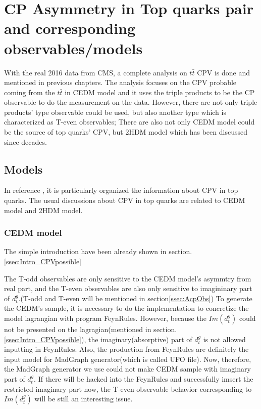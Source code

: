 

\section{CP Asymmetry in Top quarks pair and corresponding observables/models}
\label{sec:AcpModelObs}

	With the real 2016 data from CMS, a complete analysis on $t\bar{t}$ CPV is done and mentioned in previous chapters. The analysis focuses on the CPV probable coming from the $t\bar{t}$ in CEDM model and it uses the triple products to be the CP observable to do the measurement on the data. However, there are not only triple products' type observable could be used, but also another type which is characterized as T-even observables; There are also not only CEDM model could be the source of top quarks' CPV, but 2HDM model which has been discussed since decades. 

	\subsection{Models}
	\label{ssec:AcpModel}

		In reference \cite{Atwood:2000tu}, it is particularly organized the information about CPV in top quarks. The usual discussions about CPV in top quarks are related to CEDM model and 2HDM model.

		\subsubsection{ CEDM model}
		\label{sssec:AcpModel_CEDM}

			The simple introduction have been already shown in section.\ref{ssec:Intro_CPVpossible}

			The T-odd observables are only sensitive to the CEDM model's asymmtry from real part, and the T-even observables are also only sensitive to imagininary part of $d_t^g$.(T-odd and T-even will be mentioned in section\ref{ssec:AcpObs}) To generate the CEDM's sample, it is necessary to do the implementation to concretize the model lagrangian with program FeynRules\cite{Christensen:2008py}. However, because the $Im(d_t^g)$ could not be presented on the lagragian(mentioned in section.\ref{ssec:Intro_CPVpossible}), the imaginary(absorptive) part of $d_t^g$ is not allowed inputting in FeynRules. Also, the production from FeynRules are definitely the input model for MadGraph generator(which is called UFO file). Now, therefore, the MadGraph generator we use could not make CEDM sample with imaginary part of $d_t^g$. If there will be hacked into the FeynRules and successfully imsert the restricted imaginary part now, the T-even observable behavior corresponding to $Im(d_t^g)$ will be still an interesting issue.

